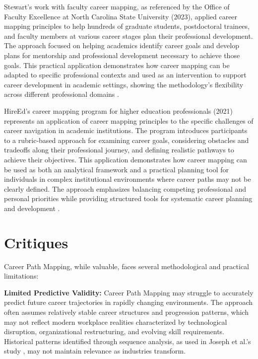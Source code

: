 \documentclass{article}
\begin{document}
Stewart's work with faculty career mapping, as referenced by the Office of Faculty Excellence at North Carolina State University (2023), applied career mapping principles to help hundreds of graduate students, postdoctoral trainees, and faculty members at various career stages plan their professional development. The approach focused on helping academics identify career goals and develop plans for mentorship and professional development necessary to achieve those goals. This practical application demonstrates how career mapping can be adapted to specific professional contexts and used as an intervention to support career development in academic settings, showing the methodology's flexibility across different professional domains \citep{ncsu2023}.

HireEd's career mapping program for higher education professionals (2021) represents an application of career mapping principles to the specific challenges of career navigation in academic institutions. The program introduces participants to a rubric-based approach for examining career goals, considering obstacles and tradeoffs along their professional journey, and defining realistic pathways to achieve their objectives. This application demonstrates how career mapping can be used as both an analytical framework and a practical planning tool for individuals in complex institutional environments where career paths may not be clearly defined. The approach emphasizes balancing competing professional and personal priorities while providing structured tools for systematic career planning and development \citep{hireed2021}.

\section{Critiques}

Career Path Mapping, while valuable, faces several methodological and practical limitations:

\textbf{Limited Predictive Validity:} Career Path Mapping may struggle to accurately predict future career trajectories in rapidly changing environments. The approach often assumes relatively stable career structures and progression patterns, which may not reflect modern workplace realities characterized by technological disruption, organizational restructuring, and evolving skill requirements. Historical patterns identified through sequence analysis, as used in Joseph et al.'s study \citep{joseph2012}, may not maintain relevance as industries transform.
\end{document}
